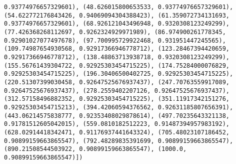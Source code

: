 \documentclass[11pt]{article}
\begin{document}
\begin{Verbatim}[commandchars=\\\{\}]
0.93774976657329601), (48.626015800653533, 0.93774976657329601), (54.622772176843426, 0.94069094304388423), (61.359072734131693, 0.93774976657329601), (68.926121043496948, 0.9320308123249299), (77.426368268112697, 0.9262324929971989), (86.974900261778345, 0.92901027077497678), (97.700995729922468, 0.931951447245565), (109.74987654930568, 0.92917366946778712), (123.28467394420659, 0.92917366946778712), (138.48863713938718, 0.9320308123249299), (155.56761439304722, 0.92925303454715225), (174.75284000076829, 0.92925303454715225), (196.30406500402725, 0.92925303454715225), (220.51307399030458, 0.92647525676937437), (247.70763559917089, 0.92647525676937437), (278.2559402207126, 0.92647525676937437), (312.57158496882352, 0.92925303454715225), (351.11917342151276, 0.92925303454715213), (394.42060594376562, 0.92631185807656391), (443.06214575838777, 0.92353408029878614), (497.70235643321138, 0.91781512605042015), (559.0810182512223, 0.91487394957983192), (628.02914418342471, 0.91176937441643324), (705.48023107186452, 0.90899159663865547), (792.48289835391699, 0.90899159663865547), (890.21508544503922, 0.90899159663865547), (1000.0, 0.90899159663865547)])

\end{Verbatim}
\end{document}
